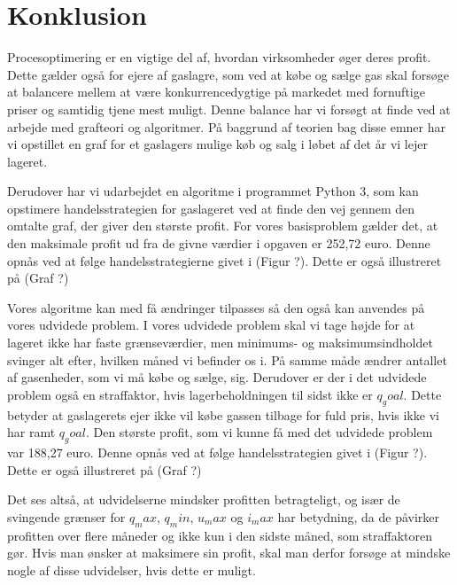 \chapter{Konklusion}
Procesoptimering er en vigtige del af, hvordan virksomheder øger deres profit. Dette gælder også for ejere af gaslagre, som ved at købe og sælge gas skal forsøge at balancere mellem at være konkurrencedygtige på markedet med fornuftige priser og samtidig tjene mest muligt. Denne balance har vi forsøgt at finde ved at arbejde med grafteori og algoritmer. På baggrund af teorien bag disse emner har vi opstillet en graf for et gaslagers mulige køb og salg i løbet af det år vi lejer lageret. 

Derudover har vi udarbejdet en algoritme i programmet Python 3, som kan opstimere handelsstrategien for gaslageret ved at finde den vej gennem den omtalte graf, der giver den største profit. For vores basisproblem gælder det, at den maksimale profit ud fra de givne værdier i opgaven er 252,72 euro. Denne opnås ved at følge handelsstrategierne givet i (Figur ?). Dette er også illustreret på (Graf ?) 

Vores algoritme kan med få ændringer tilpasses så den også kan anvendes på vores udvidede problem. I vores udvidede problem skal vi tage højde for at lageret ikke har faste grænseværdier, men minimums- og maksimumsindholdet svinger alt efter, hvilken måned vi befinder os i. På samme måde ændrer antallet af gasenheder, som vi må købe og sælge, sig. Derudover er der i det udvidede problem også en straffaktor, hvis lagerbeholdningen til sidst ikke er $q_goal$. Dette betyder at gaslagerets ejer ikke vil købe gassen tilbage for fuld pris, hvis ikke vi har ramt $q_goal$. Den største profit, som vi kunne få med det udvidede problem var 188,27 euro. Denne opnås ved at følge handelsstrategien givet i (Figur ?). Dette er også illustreret på (Graf ?)


Det ses altså, at udvidelserne mindsker profitten betragteligt, og især de svingende grænser for $q_max$, $q_min$, $u_max$ og $i_max$ har betydning, da de påvirker profitten over flere måneder og ikke kun i den sidste måned, som straffaktoren gør. Hvis man ønsker at maksimere sin profit, skal man derfor forsøge at mindske nogle af disse udvidelser, hvis dette er muligt.


